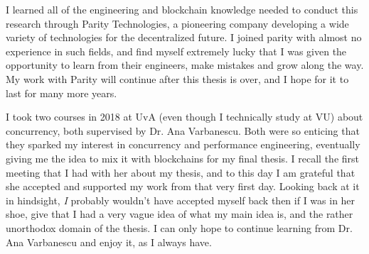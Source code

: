 \begin{acknowledgements}

I learned all of the engineering and blockchain knowledge needed to conduct this research through
Parity Technologies, a pioneering company developing a wide variety of technologies for the
decentralized future. I joined parity with almost no experience in such fields, and find myself
extremely lucky that I was given the opportunity to learn from their engineers, make mistakes and
grow along the way. My work with Parity will continue after this thesis is over, and I hope for it
to last for many more years.

I took two courses in 2018 at UvA (even though I technically study at VU) about concurrency, both
supervised by Dr. Ana Varbanescu. Both were so enticing that they sparked my interest in concurrency
and performance engineering, eventually giving me the idea to mix it with blockchains for my final
thesis. I recall the first meeting that I had with her about my thesis, and to this day I am
grateful that she accepted and supported my work from that very first day. Looking back at it in
hindsight, \textit{I} probably wouldn't have accepted myself back then if I was in her shoe, give
that I had a very vague idea of what my main idea is, and the rather unorthodox domain of the
thesis. I can only hope to continue learning from Dr. Ana Varbanescu and enjoy it, as I always have.

\end{acknowledgements}
